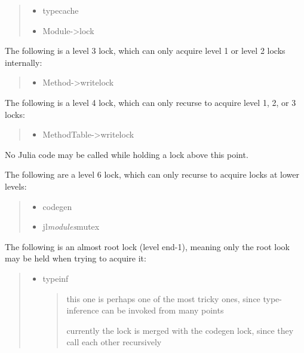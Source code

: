 \begin{quote}
\begin{itemize}
\item typecache


\item Module->lock

\end{itemize}
\end{quote}


The following is a level 3 lock, which can only acquire level 1 or level 2 locks internally:



\begin{quote}
\begin{itemize}
\item Method->writelock

\end{itemize}
\end{quote}


The following is a level 4 lock, which can only recurse to acquire level 1, 2, or 3 locks:



\begin{quote}
\begin{itemize}
\item MethodTable->writelock

\end{itemize}
\end{quote}


No Julia code may be called while holding a lock above this point.



The following are a level 6 lock, which can only recurse to acquire locks at lower levels:



\begin{quote}
\begin{itemize}
\item codegen


\item jl\emph{modules}mutex

\end{itemize}
\end{quote}


The following is an almost root lock (level end-1), meaning only the root look may be held when trying to acquire it:



\begin{quote}
\begin{itemize}
\item typeinf

\begin{quote}
this one is perhaps one of the most tricky ones, since type-inference can be invoked from many points

currently the lock is merged with the codegen lock, since they call each other recursively

\end{quote}
\end{itemize}
\end{quote}


